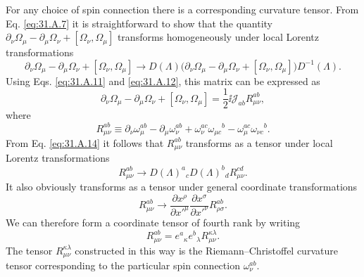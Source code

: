 For any choice of spin connection there is a corresponding curvature
tensor. From Eq. \eqref{eq:31.A.7} it is straightforward to show that the
quantity
\(\partial_\nu\Omega_\mu-\partial_\mu\Omega_\nu+
[\Omega_\nu,\Omega_\mu]\) transforms homogeneously under local Lorentz
transformations
\begin{equation}
  \partial_\nu\Omega_\mu-\partial_\mu\Omega_\nu
  +[\Omega_\nu,\Omega_\mu]
  \longrightarrow
  D(\Lambda)
  \bigl(
    \partial_\nu\Omega_\mu-\partial_\mu\Omega_\nu
    +[\Omega_\nu,\Omega_\mu]
  \bigr)D^{-1}(\Lambda).
  \tag{31.A.14}\label{eq:31.A.14}
\end{equation}
Using Eqs. \eqref{eq:31.A.11} and \eqref{eq:31.A.12}, this matrix can be
expressed as
\begin{equation}
  \partial_\nu\Omega_\mu-\partial_\mu\Omega_\nu
  +[\Omega_\nu,\Omega_\mu]
  =\frac{1}{2}\ii\mathscr{J}_{ab}R_{\mu\nu}^{ab},
  \tag{31.A.15}\label{eq:31.A.15}
\end{equation}
where
\begin{equation}
  R_{\mu\nu}^{ab}
  \equiv
  \partial_\nu\omega_\mu^{ab}-\partial_\mu\omega_\nu^{ab}
  +\omega_\nu^{ac}\omega_{\mu c}{}^b
  -\omega_\mu^{ac}\omega_{\nu c}{}^b.
  \tag{31.A.16}\label{eq:31.A.16}
\end{equation}
From Eq. \eqref{eq:31.A.14} it follows that \(R_{\mu\nu}^{ab}\)
transforms as a tensor under local Lorentz transformations
\begin{equation}
  R_{\mu\nu}^{ab}
  \longrightarrow
  D(\Lambda)^a{}_cD(\Lambda)^b{}_dR_{\mu\nu}^{cd}.
  \tag{31.A.17}\label{eq:31.A.17}
\end{equation}
It also obviously transforms as a tensor under general coordinate
transformations
\begin{equation}
  R_{\mu\nu}^{ab}
  \longrightarrow
  \frac{\partial x^\rho}{\partial x'^\mu}
  \frac{\partial x^\sigma}{\partial x'^\nu}
  R_{\rho\sigma}^{ab}.
  \tag{31.A.18}\label{eq:31.A.18}
\end{equation}
We can therefore form a coordinate tensor of fourth rank by writing
\begin{equation}
  R_{\mu\nu}^{ab}
  =e^a{}_\kappa e^b{}_\lambda R_{\mu\nu}^{\kappa\lambda}.
  \tag{31.A.19}\label{eq:31.A.19}
\end{equation}
The tensor \(R_{\mu\nu}^{\kappa\lambda}\) constructed in this way is the
Riemann--Christoffel curvature tensor corresponding to the particular
spin connection \(\omega_\nu^{ab}\).
